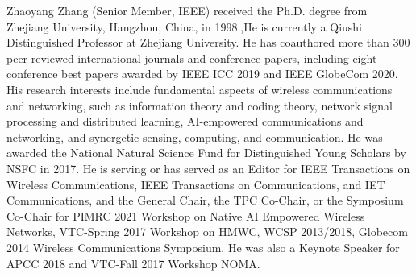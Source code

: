 \documentclass[journal]{IEEEtran}
\begin{document}
\begin{IEEEbiography}
{Zhaoyang Zhang}  (Senior Member, IEEE) received the Ph.D. degree from Zhejiang University, Hangzhou, China, in 1998.,He is currently a Qiushi Distinguished Professor at Zhejiang University. He has coauthored more than 300 peer-reviewed international journals and conference papers, including eight conference best papers awarded by IEEE ICC 2019 and IEEE GlobeCom 2020. His research interests include fundamental aspects of wireless communications and networking, such as information theory and coding theory, network signal processing and distributed learning, AI-empowered communications and networking, and synergetic sensing, computing, and communication. He was awarded the National Natural Science Fund for Distinguished Young Scholars by NSFC in 2017. He is serving or has served as an Editor for IEEE Transactions on Wireless Communications, IEEE Transactions on Communications, and IET Communications, and the General Chair, the TPC Co-Chair, or the Symposium Co-Chair for PIMRC 2021 Workshop on Native AI Empowered Wireless Networks, VTC-Spring 2017 Workshop on HMWC, WCSP 2013/2018, Globecom 2014 Wireless Communications Symposium. He was also a Keynote Speaker for APCC 2018 and VTC-Fall 2017 Workshop NOMA.
\end{IEEEbiography}
\end{document}
